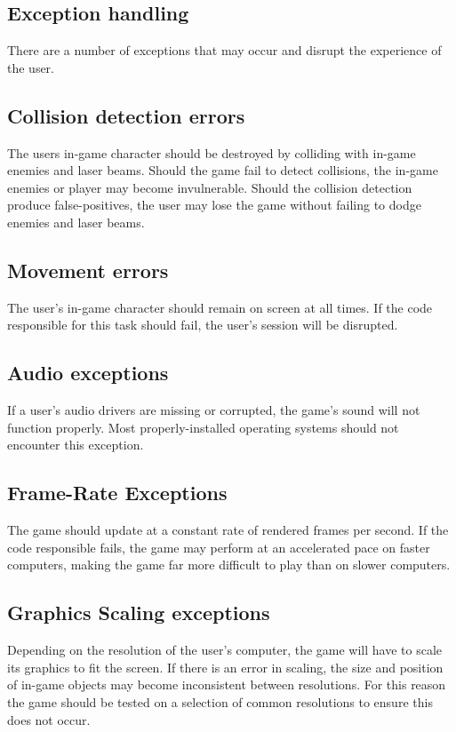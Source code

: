 \subsection*{Exception handling}
    There are a number of exceptions that may occur and disrupt the
    experience of the user.

\subsection*{Collision detection errors}
    The users in-game character should be destroyed by colliding
    with in-game enemies and laser beams. Should the game fail to
    detect collisions, the in-game enemies or player may become
    invulnerable. Should the collision detection produce
    false-positives, the user may lose the game without failing to
    dodge enemies and laser beams.

\subsection*{Movement errors}
    The user's in-game character should remain on screen at all
    times. If the code responsible for this task should fail, the
    user's session will be disrupted.

\subsection*{Audio exceptions}
    If a user's audio drivers are missing or corrupted, the game's
    sound will not function properly. Most properly-installed
    operating systems should not encounter this exception.

\subsection*{Frame-Rate Exceptions}
    The game should update at a constant rate of rendered frames per
    second. If the code responsible fails, the game may perform at
    an accelerated pace on faster computers, making the game far
    more difficult to play than on slower computers.

\subsection*{Graphics Scaling exceptions}
    Depending on the resolution of the user's computer, the game
    will have to scale its graphics to fit the screen. If there is
    an error in scaling, the size and position of in-game objects
    may become inconsistent between resolutions. For this reason the
    game should be tested on a selection of common resolutions to
    ensure this does not occur.

